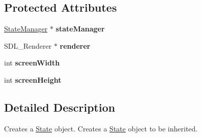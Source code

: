 \subsection*{Protected Attributes}
\begin{DoxyCompactItemize}
\item 
\hypertarget{class_state_a78388f59b0a570faa4b7ea640fea668e}{\hyperlink{class_state_manager}{State\+Manager} $\ast$ {\bfseries state\+Manager}}\label{class_state_a78388f59b0a570faa4b7ea640fea668e}

\item 
\hypertarget{class_state_ad79f979055823ec66fb7919e90ddd5c9}{S\+D\+L\+\_\+\+Renderer $\ast$ {\bfseries renderer}}\label{class_state_ad79f979055823ec66fb7919e90ddd5c9}

\item 
\hypertarget{class_state_a6fab86df7026a683af0dd9b81eea65c5}{int {\bfseries screen\+Width}}\label{class_state_a6fab86df7026a683af0dd9b81eea65c5}

\item 
\hypertarget{class_state_afd877e4a19f392ed3915b518c49cb68b}{int {\bfseries screen\+Height}}\label{class_state_afd877e4a19f392ed3915b518c49cb68b}

\end{DoxyCompactItemize}


\subsection{Detailed Description}
Creates a \hyperlink{class_state}{State} object. Creates a \hyperlink{class_state}{State} object to be inherited. 

